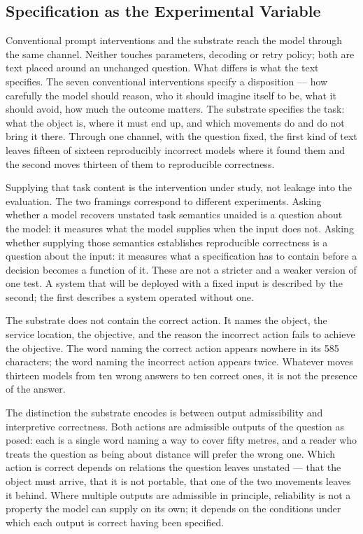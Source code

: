 \subsection{Specification as the Experimental Variable}
\label{sec:specification-variable}

Conventional prompt interventions and the substrate reach the model through the same
channel. Neither touches parameters, decoding or retry policy; both are text placed
around an unchanged question. What differs is what the text specifies. The seven
conventional interventions specify a disposition --- how carefully the model should
reason, who it should imagine itself to be, what it should avoid, how much the
outcome matters. The substrate specifies the task: what the object is, where it must
end up, and which movements do and do not bring it there. Through one channel, with
the question fixed, the first kind of text leaves fifteen of sixteen reproducibly
incorrect models where it found them and the second moves thirteen of them to
reproducible correctness.

Supplying that task content is the intervention under study, not leakage into the
evaluation. The two framings correspond to different experiments. Asking whether a
model recovers unstated task semantics unaided is a question about the model: it
measures what the model supplies when the input does not. Asking whether supplying
those semantics establishes reproducible correctness is a question about the input:
it measures what a specification has to contain before a decision becomes a function
of it. These are not a stricter and a weaker version of one test. A system that will
be deployed with a fixed input is described by the second; the first describes a
system operated without one.

The substrate does not contain the correct action. It names the object, the service
location, the objective, and the reason the incorrect action fails to achieve the
objective. The word naming the correct action appears nowhere in its 585 characters;
the word naming the incorrect action appears twice. Whatever moves thirteen models
from ten wrong answers to ten correct ones, it is not the presence of the answer.

The distinction the substrate encodes is between output admissibility and
interpretive correctness. Both actions are admissible outputs of the question as
posed: each is a single word naming a way to cover fifty metres, and a reader who
treats the question as being about distance will prefer the wrong one. Which action
is correct depends on relations the question leaves unstated --- that the object must
arrive, that it is not portable, that one of the two movements leaves it behind.
Where multiple outputs are admissible in principle, reliability is not a property the
model can supply on its own; it depends on the conditions under which each output is
correct having been specified.

